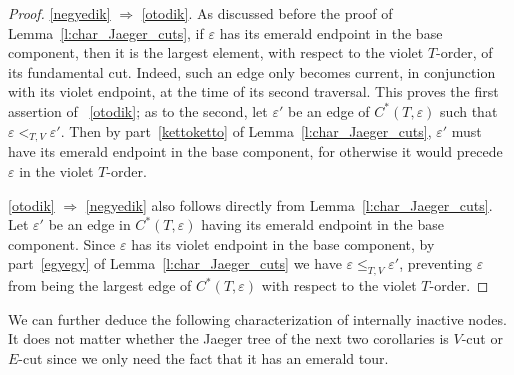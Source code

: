 \documentclass[ALCO,ThmDefs,Unicode,epreuves]{cedram}
\begin{document}
\begin{proof}

\ref{negyedik} $\Rightarrow$ \ref{otodik}. As discussed before the proof of Lemma~\ref{l:char_Jaeger_cuts}, if $\varepsilon$ has its emerald endpoint in the base component, then it is the largest element, with respect to the violet $T$-order, of its fundamental cut. Indeed, such an edge only becomes current, in conjunction with its violet endpoint, at the time of its second traversal. This proves the first assertion of ~\ref{otodik}; as to the second, let $\varepsilon'$ be an edge of $C^*(T,\varepsilon)$ such that $\varepsilon <_{T,V}\varepsilon'$. Then by part~\ref{kettoketto} of Lemma~\ref{l:char_Jaeger_cuts}, $\varepsilon'$ must have its emerald endpoint in the base component, for otherwise it would precede $\varepsilon$ in the violet $T$-order.


\ref{otodik} $\Rightarrow$ \ref{negyedik} also follows directly from Lemma~\ref{l:char_Jaeger_cuts}. Let $\varepsilon'$ be an edge in $C^*(T,\varepsilon)$ having its emerald endpoint in the base component. Since $\varepsilon$ has its violet endpoint in the base component, by part~\ref{egyegy} of Lemma~\ref{l:char_Jaeger_cuts} we have $\varepsilon \leq_{T,V} \varepsilon'$, preventing $\varepsilon$ from being the largest edge of $C^*(T,\varepsilon)$ with respect to the violet $T$-order.
\end{proof}

We can further deduce the following characterization of internally inactive nodes. It does not matter whether the Jaeger tree of the next two corollaries is $V$-cut or $E$-cut since we only need the fact that it has an emerald tour.
\end{document}
